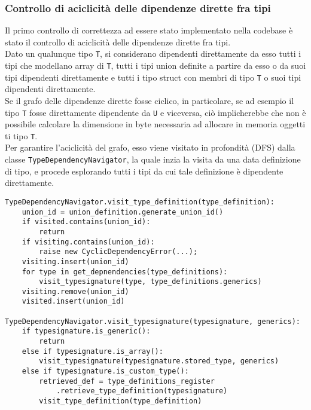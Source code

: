 \subsubsection{Controllo di aciclicità delle dipendenze dirette fra tipi}
Il primo controllo di correttezza ad essere stato implementato nella codebase è 
stato il controllo di aciclicità delle dipendenze dirette fra tipi. \\

Dato un qualunque tipo \texttt{T}, si considerano dipendenti direttamente da esso 
tutti i tipi che modellano array di \texttt{T}, tutti i tipi union definite a partire da 
esso o da suoi tipi dipendenti direttamente e tutti i tipo struct con membri di tipo \texttt{T} o suoi
tipi dipendenti direttamente. \\

Se il grafo delle dipendenze dirette fosse ciclico, in particolare, se ad esempio il tipo \texttt{T}
fosse direttamente dipendente da \texttt{U} e viceversa, ciò implicherebbe che non è possibile calcolare 
la dimensione in byte necessaria ad allocare in memoria oggetti ti tipo \texttt{T}. \\

Per garantire l'aciclicità del grafo, esso viene visitato in profondità (DFS) dalla classe 
\texttt{TypeDependencyNavigator}, la quale inzia la visita da una data definizione di tipo, e 
procede esplorando tutti i tipi da cui tale definizione è dipendente direttamente.

\vspace{0.5cm}
\begin{lstlisting}[frame=single]
TypeDependencyNavigator.visit_type_definition(type_definition):
    union_id = union_definition.generate_union_id()
    if visited.contains(union_id):
        return
    if visiting.contains(union_id):
        raise new CyclicDependencyError(...);
    visiting.insert(union_id)
    for type in get_depnendencies(type_definitions):
        visit_typesignature(type, type_definitions.generics)
    visiting.remove(union_id)
    visited.insert(union_id)

TypeDependencyNavigator.visit_typesignature(typesignature, generics):
    if typesignature.is_generic():
        return
    else if typesignature.is_array():
        visit_typesignature(typesignature.stored_type, generics)
    else if typesignature.is_custom_type():
        retrieved_def = type_definitions_register
            .retrieve_type_definition(typesignature)
        visit_type_definition(type_definition)
\end{lstlisting}
\vspace{0.5cm}

\newpage